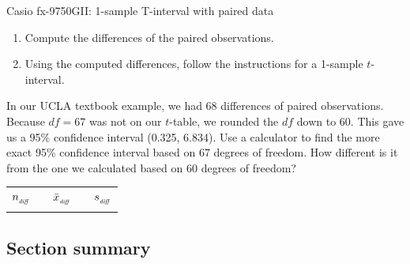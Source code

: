 \begin{onebox}{Casio fx-9750GII: 1-sample T-interval with paired data}
\begin{enumerate}
\setlength{\itemsep}{0mm}
\item Compute the differences of the paired observations.
\item Using the computed differences, follow the instructions for a 1-sample $t$-interval.
\end{enumerate}
\end{onebox}



\begin{exercisewrap}
\begin{nexercise}
In our UCLA textbook example, we had 68 differences of paired observations.  Because $df=67$ was not on our $t$-table, we rounded the $df$ down to 60.  This gave us a 95\% confidence interval (0.325, 6.834).  Use a calculator to find the more exact 95\% confidence interval based on 67 degrees of freedom.  How different is it from the one we calculated based on 60 degrees of freedom?\footnotemark
\begin{center}
\begin{tabular}{ccccc}
\hline
$n_{_{\text{\emph{diff}}}}$	&\hspace{3mm}& $\bar{x}_{_{\text{\emph{diff}}}}$	&\hspace{3mm}& $s_{_{\text{\emph{diff}}}}$ \vspace{1mm}\\
\uclabookN{}  && \uclabookM{}  && \uclabookSD{} \\
\hline
\end{tabular}
\end{center}
\end{nexercise}
\end{exercisewrap}


\D{\newpage}

\subsection*{Section summary}

